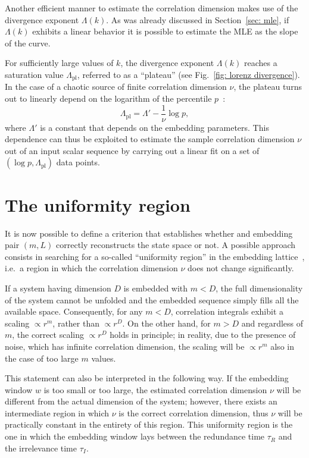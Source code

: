 Another efficient manner to estimate the correlation dimension makes use of the divergence exponent
$\Lambda(k)$. As was already discussed in Section~\ref{sec: mle}, if $\Lambda(k)$ exhibits a
linear behavior it is possible to estimate the MLE as the slope of the curve.

For sufficiently large values of $k$, the divergence exponent $\Lambda(k)$
reaches a saturation value $\Lambda_{\text{pl}}$, referred to as a ``plateau'' (see Fig.~\ref{fig: lorenz divergence}).
In the case of a chaotic source of finite correlation dimension $\nu$, the plateau
turns out to linearly depend on the logarithm of the percentile $p$~\cite{ref:perinelli2020chasing}:
\begin{equation}
    \label{eq: Lambda plateau}
    \Lambda_{\text{pl}}=\Lambda'-\frac{1}{\nu}\log p,
\end{equation}
where $\Lambda'$ is a constant that depends on the embedding parameters.
This dependence can thus be exploited to estimate the
sample correlation dimension $\nu$ out of an input scalar sequence by
carrying out a linear fit on a set of $(\log p, \Lambda_{\text{pl}})$ data points.


\section{The uniformity region}\label{sec: uniformity region}

It is now possible to define a criterion that establishes whether and embedding
pair $(m,L)$ correctly reconstructs the state space or not.
A possible approach consists in searching for a so-called ``uniformity region'' in the embedding
lattice~\cite{ref:perinelli2020chasing}, i.e.\ a region in which the correlation dimension $\nu$
does not change significantly.

If a system having dimension $D$ is embedded with $m < D$, the full dimensionality of the system cannot
be unfolded and the embedded sequence simply fills all the available space. Consequently, for any
$m < D$, correlation integrals exhibit a scaling $\propto r^m$, rather than $\propto r^D$.
On the other hand, for $m > D$ and regardless of $m$, the correct scaling $\propto r^D$ holds in principle;
in reality, due to the presence of noise, which has infinite correlation dimension, the scaling will
be $\propto r^m$ also in the case of too large $m$ values.

This statement can also be interpreted in the following way.
If the embedding window $w$ is too small or too large, the estimated correlation dimension $\nu$
will be different from the actual dimension of the system; however, there exists an intermediate region
in which $\nu$ is the correct correlation dimension, thus $\nu$ will be practically constant in
the entirety of this region. This uniformity region is the one in which the embedding window lays between
the redundance time $\tau_R$ and the irrelevance time $\tau_I$.


